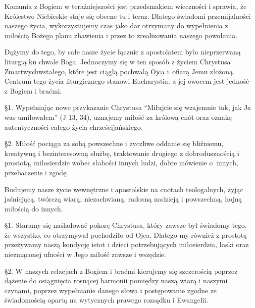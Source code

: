 

 Komunia z Bogiem w teraźniejszości jest przedsmakiem wieczności i sprawia, że Królestwo Niebieskie staje się obecne tu i teraz. Dlatego  świadomi przemijalności naszego życia, wykorzystujemy czas jako dar otrzymany do wypełnienia z miłością Bożego planu zbawienia i przez to zrealizowania naszego powołania.


 
 Dążymy do tego, by całe nasze życie łącznie z apostolatem było nieprzerwaną liturgią ku chwale Boga. Jednoczymy się w ten sposób z życiem Chrystusa Zmartwychwstałego, które jest ciągłą pochwałą Ojca \mbox{i ofiarą} Jemu złożoną. Centrum tego życia liturgicznego stanowi Eucharystia, a jej owocem jest jedność z Bogiem i braćmi.
 
 
 \S{}1. Wypełniając nowe przykazanie Chrystusa “Miłujcie się wzajemnie tak, jak Ja was umiłowałem” (J 13, 34), uznajemy miłość za królową cnót oraz oznakę autentyczności całego życia chrześcijańskiego.


\S{}2. Miłość pociąga za sobą powszechne i życzliwe oddanie się bliźniemu, kreatywną i bezinteresowną służbę, traktowanie drugiego z dobrodusznością i prostotą, miłosierdzie wobec słabości innych ludzi, dobre mówienie \mbox{o innych}, przebaczenie i zgodę.
 


 Budujemy nasze życie wewnętrzne i apostolskie na cnotach teologalnych, żyjąc jaśniejącą, twórczą wiarą, niezachwianą, radosną nadzieją i powszechną, hojną miłością do innych. 
 
\filbreak{}
 
 \S{}1. Staramy się naśladować pokorę Chrystusa, który zawsze był świadomy tego, że wszystko, co otrzymywał pochodziło od Ojca. Dlatego my również z prostotą przeżywamy naszą kondycję istot i dzieci potrzebujących miłosierdzia, łaski oraz niezmąconej ufności w Jego miłość zawsze i wszędzie.


\S{}2. W naszych relacjach z Bogiem i braćmi kierujemy się szczerością poprzez dążenie do osiągnięcia rosnącej harmonii pomiędzy naszą wiarą i naszymi czynami, poprzez wypełnianie danego słowa i postępowanie zgodne ze świadomością opartą na wytycznych prawego rozsądku i Ewangelii.
 
 
